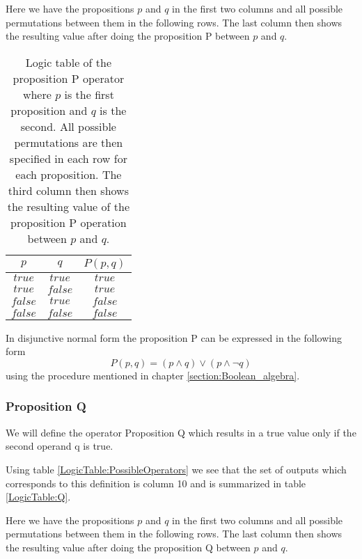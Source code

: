        Here we have the propositions $p$ and $q$ in the first two columns and all possible permutations between them in the following rows. The last column then shows the resulting value after doing the proposition P between $p$ and $q$.
        
        \begin{table}[h!]
            \centering
            \begin{tabular}{|c|c|c|}
            	\hline
            	  $p$   &   $q$   & $P(p, q)$ \\ \hline
            	$true$  & $true$  &  $true$   \\ \hline
            	$true$  & $false$ &  $true$   \\ \hline
            	$false$ & $true$  &  $false$  \\ \hline
            	$false$ & $false$ &  $false$  \\ \hline
            \end{tabular}
            \caption{Logic table of the proposition P operator where $p$ is the first proposition and $q$ is the second. All possible permutations are then specified in each row for each proposition. The third column then shows the resulting value of the proposition P operation between $p$ and $q$.}
            \label{LogicTable:P}
        \end{table}
        
        In disjunctive normal form the proposition P can be expressed in the following form
        \begin{equation}
            P(p, q) = (p \wedge q) \vee (p \wedge \neg q)
        \end{equation}
        using the procedure mentioned in chapter \ref{section:Boolean_algebra}.
    
    \subsubsection{Proposition Q}
        We will define the operator Proposition Q which results in a true value only if the second operand q is true.
        
        Using table \ref{LogicTable:PossibleOperators} we see that the set of outputs which corresponds to this definition is column 10 and is summarized in table \ref{LogicTable:Q}.
        
        Here we have the propositions $p$ and $q$ in the first two columns and all possible permutations between them in the following rows. The last column then shows the resulting value after doing the proposition Q between $p$ and $q$.
        
